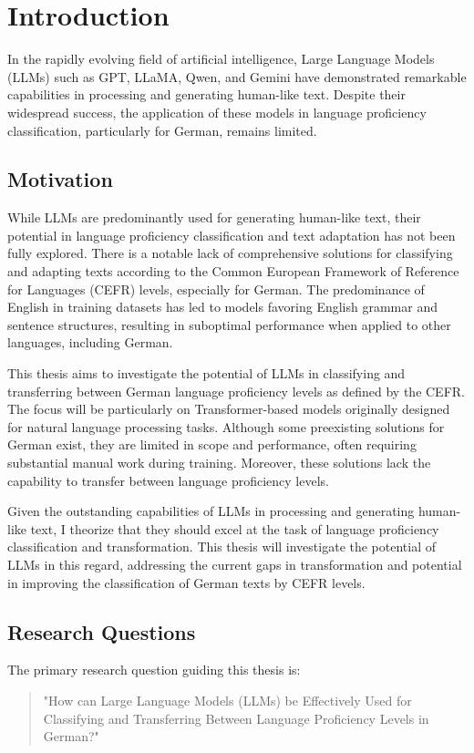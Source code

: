 \chapter{Introduction}
\label{ch:intro}
In the rapidly evolving field of artificial intelligence, Large Language Models (LLMs) such as GPT, LLaMA, Qwen, and Gemini have demonstrated remarkable capabilities in processing and generating human-like text. Despite their widespread success, the application of these models in language proficiency classification, particularly for German, remains limited.

\section{Motivation}
\label{s:motivation}
While LLMs are predominantly used for generating human-like text, their potential in language proficiency classification and text adaptation has not been fully explored. There is a notable lack of comprehensive solutions for classifying and adapting texts according to the Common European Framework of Reference for Languages (CEFR) levels, especially for German. The predominance of English in training datasets has led to models favoring English grammar and sentence structures, resulting in suboptimal performance when applied to other languages, including German.

This thesis aims to investigate the potential of LLMs in classifying and transferring between German language proficiency levels as defined by the CEFR. The focus will be particularly on Transformer-based models originally designed for natural language processing tasks. Although some preexisting solutions for German exist, they are limited in scope and performance, often requiring substantial manual work during training. Moreover, these solutions lack the capability to transfer between language proficiency levels.

Given the outstanding capabilities of LLMs in processing and generating human-like text, I theorize that they should excel at the task of language proficiency classification and transformation. This thesis will investigate the potential of LLMs in this regard, addressing the current gaps in transformation and potential in improving the classification of German texts by CEFR levels.

\section{Research Questions}
\label{s:research_questions}
The primary research question guiding this thesis is:
\begin{quote}
    "How can Large Language Models (LLMs) be Effectively Used for Classifying and Transferring Between Language Proficiency Levels in German?"
\end{quote}


